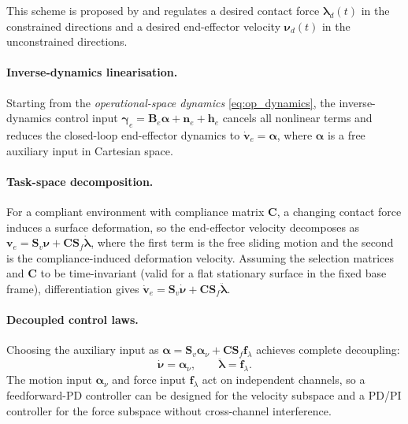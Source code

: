 \documentclass[
	german,%
	accentcolor=9c,%
	ruledheaders=section,%
	class=report,%
	thesis={type=bachelor},%
	fontsize=11pt,%
	parskip=half-,%
	custommargins=true,%
	marginpar=false,%
]{tudapub}
\begin{document}
This scheme is proposed by \cite{Siciliano_Sciavicco_Villani_Oriolo_2009} and regulates a desired contact force $\boldsymbol{\lambda}_d(t)$ in
the constrained directions and a desired end-effector velocity $\boldsymbol{\nu}_d(t)$
in the unconstrained directions.

\paragraph{Inverse-dynamics linearisation.}
Starting from the \emph{operational-space dynamics} \eqref{eq:op_dynamics}, the inverse-dynamics control input
$\boldsymbol{\gamma}_e = \mathbf{B}_e\boldsymbol{\alpha} + \mathbf{n}_e + \mathbf{h}_e$
cancels all nonlinear terms and reduces the closed-loop end-effector dynamics to
$\dot{\mathbf{v}}_e = \boldsymbol{\alpha}$, where $\boldsymbol{\alpha}$ is a
free auxiliary input in Cartesian space.

\paragraph{Task-space decomposition.}
For a compliant environment with compliance matrix $\mathbf{C}$, a changing
contact force induces a surface deformation, so the end-effector velocity
decomposes as
$\mathbf{v}_e = \mathbf{S}_v\boldsymbol{\nu} + \mathbf{C}\mathbf{S}_f\dot{\boldsymbol{\lambda}}$,
where the first term is the free sliding motion and the second is the
compliance-induced deformation velocity. Assuming the selection matrices and
$\mathbf{C}$ to be time-invariant (valid for a flat stationary surface in the
fixed base frame), differentiation gives
$\dot{\mathbf{v}}_e = \mathbf{S}_v\dot{\boldsymbol{\nu}} + \mathbf{C}\mathbf{S}_f\ddot{\boldsymbol{\lambda}}$.

\paragraph{Decoupled control laws.}
Choosing the auxiliary input as
$\boldsymbol{\alpha} = \mathbf{S}_v\boldsymbol{\alpha}_\nu + \mathbf{C}\mathbf{S}_f\mathbf{f}_\lambda$
achieves complete decoupling:
%
\begin{equation}
    \dot{\boldsymbol{\nu}} = \boldsymbol{\alpha}_\nu, \qquad
    \ddot{\boldsymbol{\lambda}} = \mathbf{f}_\lambda.
    \label{eq:decoupled}
\end{equation}
%
The motion input $\boldsymbol{\alpha}_\nu$ and force input $\mathbf{f}_\lambda$
act on independent channels, so a feedforward-PD controller can be designed
for the velocity subspace and a PD/PI controller for the force subspace
without cross-channel interference.
\end{document}

